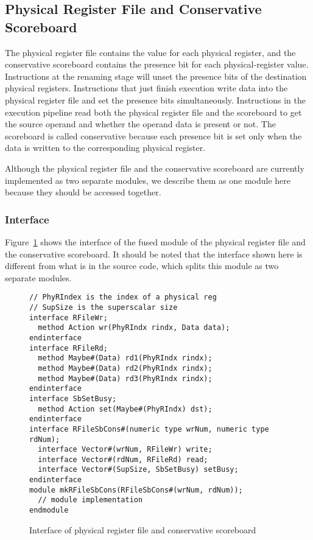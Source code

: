 \subsection{Physical Register File and Conservative Scoreboard}\label{sec:prf+sbcons}

The physical register file contains the value for each physical register, and the conservative scoreboard contains the presence bit for each physical-register value.
Instructions at the renaming stage will unset the presence bits of the destination physical registers.
Instructions that just finish execution write data into the physical register file and set the presence bits simultaneously.
Instructions in the execution pipeline read both the physical register file and the scoreboard to get the source operand and whether the operand data is present or not.
The scoreboard is called conservative because each presence bit is set only when the data is written to the corresponding physical register.

Although the physical register file and the conservative scoreboard are currently implemented as two separate modules, we describe them as one module here because they should be accessed together.

\subsubsection{Interface}
Figure~\ref{fig:prf-sb-ifc} shows the interface of the fused module of the physical register file and the conservative scoreboard.
It should be noted that the interface shown here is different from what is in the source code, which splits this module as two separate modules.

\begin{figure}[!htb]
\begin{lstlisting}[caption={}]
// PhyRIndex is the index of a physical reg
// SupSize is the superscalar size
interface RFileWr;
  method Action wr(PhyRIndx rindx, Data data);
endinterface
interface RFileRd;
  method Maybe#(Data) rd1(PhyRIndx rindx);
  method Maybe#(Data) rd2(PhyRIndx rindx);
  method Maybe#(Data) rd3(PhyRIndx rindx);
endinterface
interface SbSetBusy;
  method Action set(Maybe#(PhyRIndx) dst);
endinterface
interface RFileSbCons#(numeric type wrNum, numeric type rdNum);
  interface Vector#(wrNum, RFileWr) write;
  interface Vector#(rdNum, RFileRd) read;
  interface Vector#(SupSize, SbSetBusy) setBusy;
endinterface
module mkRFileSbCons(RFileSbCons#(wrNum, rdNum));
  // module implementation
endmodule
\end{lstlisting}
\caption{Interface of physical register file and conservative scoreboard}\label{fig:prf-sb-ifc}
\end{figure}

